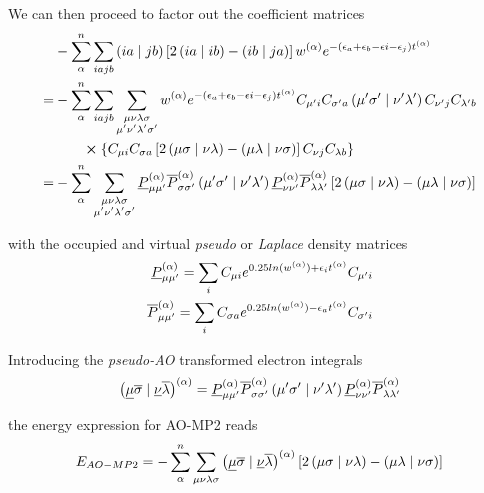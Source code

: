 \noindent We can then proceed to factor out the coefficient matrices 
\begin{equation}
\begin{split}
&- \sum_{\alpha}^n \sum_{iajb} \left( ia \mid jb \right) \left[2 \left( ia \mid ib \right) - \left( ib \mid ja \right) \right] w^{(\alpha)} e^{-\left(\epsilon_a + \epsilon_b - \epsilon i - \epsilon_j\right)t^{(\alpha)}} \\
= &- \sum_{\alpha}^n \sum_{iajb} \sum_{\substack{\mu\nu\lambda\sigma \\ \mu'\nu'\lambda'\sigma'} } w^{(\alpha)} e^{-\left(\epsilon_a + \epsilon_b - \epsilon i - \epsilon_j\right)t^{(\alpha)}} C_{\mu' i} C_{\sigma' a} \left( \mu'\sigma' \mid \nu'\lambda' \right) C_{\nu' j} C_{\lambda' b} \\ 
 & \qquad \cross \left\lbrace C_{\mu i} C_{\sigma a} \left [ 2\left( \mu\sigma \mid \nu\lambda \right) -  \left( \mu\lambda \mid \nu\sigma \right) \right] C_{\nu j} C_{\lambda b} \right\rbrace  \\
= & - \sum_{\alpha}^n \sum_{\substack{\mu\nu\lambda\sigma \\ \mu'\nu'\lambda'\sigma'}} \underline{P}^{(\alpha)}_{\mu\mu'} \overline{P}^{(\alpha)}_{\sigma\sigma'} \left( \mu'\sigma' \mid \nu'\lambda' \right) \underline{P}^{(\alpha)}_{\nu\nu'} \overline{P}^{(\alpha)}_{\lambda\lambda'} \left [ 2\left( \mu\sigma \mid \nu\lambda \right) -  \left( \mu\lambda \mid \nu\sigma \right) \right] 
\end{split}
\end{equation}

\noindent with the occupied and virtual \emph{pseudo} or \emph{Laplace} density matrices 
\begin{equation}
\begin{split}
\underline{P}^{(\alpha)}_{\mu\mu'} = \sum_i C_{\mu i} e^{0.25 ln(w^{(\alpha)}) + \epsilon_i t^{(\alpha)}} C_{\mu' i} \\
\overline{P}^{(\alpha)}_{\mu\mu'} = \sum_i C_{\sigma a} e^{0.25 ln(w^{(\alpha)}) - \epsilon_a t^{(\alpha)}} C_{\sigma' i}
\end{split}
\end{equation}

\noindent Introducing the \emph{pseudo-AO} transformed electron integrals
\begin{equation}
\left( \underline{\mu}\overline{\sigma} \mid \underline{\nu}\overline{\lambda} \right)^{(\alpha)} = \underline{P}^{(\alpha)}_{\mu\mu'} \overline{P}^{(\alpha)}_{\sigma\sigma'} \left( \mu'\sigma' \mid \nu'\lambda' \right) \underline{P}^{(\alpha)}_{\nu\nu'} \overline{P}^{(\alpha)}_{\lambda\lambda'}
\end{equation}

\noindent the energy expression for AO-MP2 reads
\begin{equation}
E_{AO-MP2} = - \sum_{\alpha}^n \sum_{\mu\nu\lambda\sigma} \left( \underline{\mu}\overline{\sigma} \mid \underline{\nu}\overline{\lambda} \right)^{(\alpha)} \left [ 2\left( \mu\sigma \mid \nu\lambda \right) -  \left( \mu\lambda \mid \nu\sigma \right) \right]
\end{equation}

